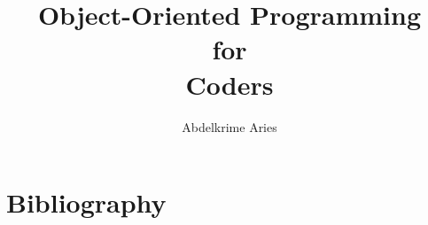 \documentclass{KodeBook}
\title{Object-Oriented Programming \\ \hspace{1cm} for \\ \hspace{2cm} Coders}
\author{Abdelkrime Aries}
\begin{document}
\maketitle

\frontmatter





\mainmatter













%


\chapter*{Bibliography}

%
\end{document}

